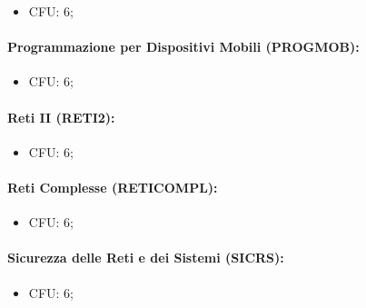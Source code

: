 \begin{itemize}
  \item CFU: 6;
\end{itemize}

\paragraph{Programmazione per Dispositivi Mobili (PROGMOB):}

\begin{itemize}
  \item CFU: 6;
\end{itemize}

\paragraph{Reti II (RETI2):}

\begin{itemize}
  \item CFU: 6;
\end{itemize}

\paragraph{Reti Complesse (RETICOMPL):}

\begin{itemize}
  \item CFU: 6;
\end{itemize}

\paragraph{Sicurezza delle Reti e dei Sistemi (SICRS):}

\begin{itemize}
  \item CFU: 6;
\end{itemize}
